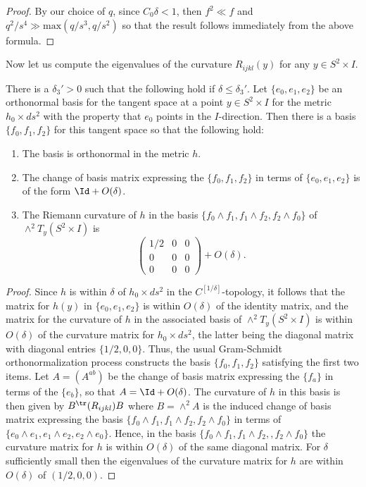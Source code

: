 \begin{proof}
By our choice of $q$, since $C_0\delta<1$, then $f^2\ll f$ and $q^2/s^4\gg \mathrm{max}(q/s^3,q/s^2)$ so that the result follows immediately from the above
formula.
\end{proof}


Now let us compute the eigenvalues of the curvature $ R_{ijkl}(y)$
for any $y\in S^2\times I$.

\begin{lemma}
\label{lem:near-cylinder-curvature-eigenbasis}\label{newbasis}
There is a $\delta_3'>0$ such that the following hold if $\delta\le
\delta_3'$. Let $\{e_0,e_1,e_2\}$ be an orthonormal basis for the
tangent space at a point $y\in S^2\times I$ for the metric
$h_0\times ds^2$ with the property that $e_0$ points in the
$I$-direction. Then there is a basis $\{f_0,f_1,f_2\}$ for this
tangent space so that the following hold:
\begin{enumerate}
\item[(1)] The basis is orthonormal in the metric $h$.
\item[(2)] The change of basis matrix expressing the $\{f_0,f_1,f_2\}$
in terms of $\{e_0,e_1,e_2\}$ is of the form $\Id+O(\delta)$.
\item[(3)] The Riemann curvature of $h$ in the basis $\{f_0\wedge f_1,f_1\wedge f_2,f_2\wedge f_0\}$
of $\wedge^2T_y(S^2\times I)$ is
$$\begin{pmatrix} 1/2 & 0 & 0 \\ 0 & 0 & 0 \\ 0 & 0 & 0
\end{pmatrix}+O(\delta).$$
\end{enumerate}
\end{lemma}


\begin{proof}
Since $h$ is within $\delta$ of $h_0\times ds^2$ in the
$C^{[1/\delta]}$-topology, it follows that the matrix for $h(y)$ in
$\{e_0,e_1,e_2\}$ is within $O(\delta)$ of the identity matrix, and the matrix
for the curvature of $h$ in the associated basis of $\wedge^2T_y(S^2\times I)$
is within $O(\delta)$ of the curvature matrix for $h_0\times ds^2$, the latter
being the diagonal matrix with diagonal entries $\{1/2,0,0\}$. Thus, the usual
Gram-Schmidt orthonormalization process constructs the basis $\{f_0,f_1,f_2\}$
satisfying the first two items. Let $A=(A^{ab})$ be the change of basis matrix
expressing the $\{f_a\}$ in terms of the $\{e_b\}$, so that $A=\Id+O(\delta)$. The curvature of $h$ in this basis is then given by
$B^{\tr}(R_{ijkl})B$ where $B=\wedge^2A$ is the induced change of basis matrix
expressing the basis $\{f_0\wedge f_1,f_1\wedge f_2,f_2\wedge f_0\}$ in terms
of $\{e_0\wedge e_1,e_1\wedge e_2,e_2\wedge e_0\}$. Hence, in the basis
$\{f_0\wedge f_1,f_1\wedge f_2,,f_2\wedge f_0\}$ the curvature matrix for $h$
is within $O(\delta)$ of the same diagonal matrix. For $\delta$ sufficiently
small then the eigenvalues of the curvature matrix for $h$ are within
$O(\delta)$ of $(1/2,0,0)$.
\end{proof}

